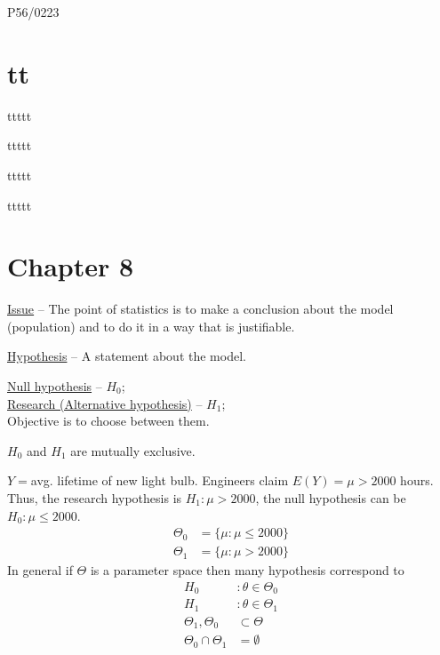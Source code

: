 \documentclass[english, 11pt]{article}
\begin{document}
P56/0223
\section{tt}


\begin{thrm}\label{thrm:436}
ttttt
\end{thrm}
\begin{thrm}\label{thrm:437}
ttttt
\end{thrm}
\begin{cor}\label{cor:438}
ttttt
\end{cor}
\begin{thrm}\label{thrm:439}
ttttt
\end{thrm}





\section{Chapter 8}

\underline{Issue} -- The point of statistics is to make a conclusion about the model (population) and to do it in a way that is justifiable.

\begin{defn}\underline{Hypothesis} -- A statement about the model.
\end{defn}

\underline{Null hypothesis} -- $H_0$;\\
\underline{Research (Alternative hypothesis)} -- $H_1$;\\
Objective is to choose between them.

$H_0$ and $H_1$ are mutually exclusive.

\begin{exmp}\label{exmp:52}
$Y=$avg. lifetime of new light bulb. Engineers claim $E(Y)=\mu>2000$ hours. Thus, the research hypothesis is $H_1:\mu>2000$, the null hypothesis can be $H_0:\mu \leqslant 2000$.\\
$$
\begin{aligned}
\Theta_0&=\{\mu:\mu\leq 2000\}\\
\Theta_1&=\{\mu:\mu>2000\}
\end{aligned}
$$
In general if $\Theta$ is a parameter space then many hypothesis correspond to
$$
\begin{aligned}
H_0&:\theta\in \Theta_0 \\
H_1&:\theta\in\Theta_1\\
\Theta_1, \Theta_0&\subset\Theta\\
\Theta_0\cap\Theta_1&=\emptyset
\end{aligned}
$$
\end{exmp}
\end{document}
